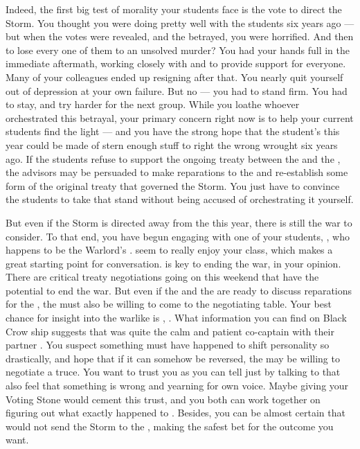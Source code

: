 \documentclass[char]{GL2020}
\begin{document}
Indeed, the first big test of morality your students face is the vote to direct the Storm. You thought you were doing pretty well with the students six years ago — but when the votes were revealed, and the \pShip{} betrayed, you were horrified. And then to lose every one of them to an unsolved murder? You had your hands full in the immediate aftermath, working closely with \cFlowPriest{\full} and \cMusic{\full} to provide support for everyone. Many of your colleagues ended up resigning after that. You nearly quit yourself out of depression at your own failure. But no — you had to stand firm. You had to stay, and try harder for the next group. While you loathe whoever orchestrated this betrayal, your primary concern right now is to help your current students find the light — and you have the strong hope that the student's this year could be made of stern enough stuff to right the wrong wrought six years ago. If the students refuse to support the ongoing treaty between the \pFarm{} and the \pTech{}, the advisors may be persuaded to make reparations to the \pShip{} and re-establish some form of the original treaty that governed the Storm. You just have to convince the students to take that stand without being accused of orchestrating it yourself.

But even if the Storm is directed away from the \pShip{} this year, there is still the war to consider. To that end, you have begun engaging with one of your \pShippie{} students, \cWarlordDaughter{\full}, who happens to be the Warlord's \cWarlordDaughter{\offspring}. \cWarlordDaughter{\They} seem\cWarlordDaughter{\verbs} to really enjoy your class, which makes a great starting point for conversation. \cWarlordDaughter{} is key to ending the war, in your opinion. There are critical treaty negotiations going on this weekend that have the potential to end the war. But even if the \pFarm{} and the \pTech{} are ready to discuss reparations for the \pShippies{}, the \pShip{} must also be willing to come to the negotiating table. Your best chance for insight into the warlike \cLoud{\full} is \cLoud{\their} \cWarlordDaughter{\offspring}, \cWarlordDaughter{}. What information you can find on Black Crow ship suggests that \cLoud{} was quite the calm and patient co-captain with their partner \cQuiet{\full}. You suspect something must have happened to shift \cLoud{\their} personality so drastically, and hope that if it can somehow be reversed, the \pShip{} may be willing to negotiate a truce. You want \cWarlordDaughter{} to trust you as you can tell just by talking to \cWarlordDaughter{\them} that \cWarlordDaughter{\they} also feel\cWarlordDaughter{\verbs} that something is wrong and \cWarlordDaughter{\are} yearning for \cWarlordDaughter{\their} own voice. Maybe giving \cWarlordDaughter{} your Voting Stone would cement this trust, and you both can work together on figuring out what exactly happened to \cLoud{}. Besides, you can be almost certain that \cWarlordDaughter{} would not send the Storm to the \pShip{}, making \cWarlordDaughter{} the safest bet for the outcome you want. 
\end{document}
